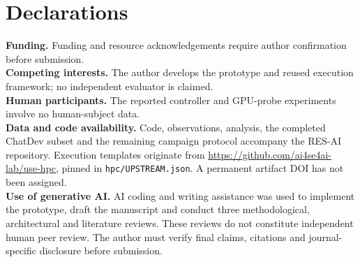 \documentclass[pdflatex,sn-mathphys-num]{sn-jnl}
\theoremstyle{thmstylethree}
\newcommand{\code}[1]{\texttt{#1}}
\begin{document}
\section*{Declarations}
\textbf{Funding.} Funding and resource acknowledgements require author confirmation before submission.\\
\textbf{Competing interests.} The author develops the prototype and reused execution framework; no independent evaluator is claimed.\\
\textbf{Human participants.} The reported controller and GPU-probe experiments involve no human-subject data.\\
\textbf{Data and code availability.} Code, observations, analysis, the completed ChatDev subset and the remaining campaign protocol accompany the RES-AI repository. Execution templates originate from \url{https://github.com/ai4se4ai-lab/use-hpc}, pinned in \code{hpc/UPSTREAM.json}. A permanent artifact DOI has not been assigned.\\
\textbf{Use of generative AI.} AI coding and writing assistance was used to implement the prototype, draft the manuscript and conduct three methodological, architectural and literature reviews. These reviews do not constitute independent human peer review. The author must verify final claims, citations and journal-specific disclosure before submission.

\end{document}
